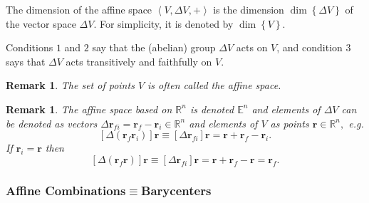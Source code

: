\documentclass[aps,preprint]{revtex4}%
\newtheorem{remark}[theorem]{Remark}
\begin{document}
The dimension of the affine space $\left\langle V,\Delta V,+\right\rangle $ is
the dimension $\dim\left\{  \Delta V\right\}  $ of the vector space $\Delta
V$. For simplicity, it is denoted by $\dim\left\{  V\right\}  .$

Conditions $1$ and $2$ say that the (abelian) group $\Delta V$ acts on $V$,
and condition $3$ says that $\Delta V$ acts transitively and faithfully on $V$.

\begin{remark}
The set of points $V$ is often called the affine space.
\end{remark}

\begin{remark}
The affine space based on $\mathbb{R}^{n}$ is denoted $\mathbb{E}^{n}$ and
elements of $\Delta V$ can be denoted as vectors $\Delta\mathbf{r}%
_{fi}=\mathbf{r}_{f}-\mathbf{r}_{i}\in\mathbb{R}^{n}$ and elements of $V$ as
points $\mathbf{r}\in\mathbb{R}^{n},$ e.g.%
\begin{equation}
\left[  \Delta\left(  \mathbf{r}_{f}\mathbf{r}_{i}\right)  \right]
\mathbf{r}\equiv\left[  \Delta\mathbf{r}_{fi}\right]  \mathbf{r=r+r}%
_{f}-\mathbf{r}_{i}.
\end{equation}
If $\mathbf{r}_{i}=\mathbf{r}$ then
\begin{equation}
\left[  \Delta\left(  \mathbf{r}_{f}\mathbf{r}\right)  \right]  \mathbf{r}%
\equiv\left[  \Delta\mathbf{r}_{fi}\right]  \mathbf{r=r+r}_{f}-\mathbf{r}%
=\mathbf{r}_{f}.
\end{equation}

\end{remark}

\subsubsection{Affine Combinations$\equiv$Barycenters}
\end{document}
